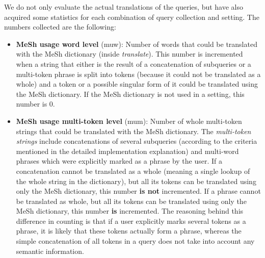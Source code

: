 \documentclass[a4paper,11pt]{article}
\begin{document}
	We do not only evaluate the actual translations of the queries, but have also acquired some statistics for each combination of query collection and setting. The numbers collected are the following:
	\begin{itemize}
		\item \textbf{MeSh usage word level} (muw): Number of words that could be translated with the MeSh dictionary (inside \textit{translate}). This number is incremented when a string that either is the result of a concatenation of subqueries or a multi-token phrase is split into tokens (because it could not be translated as a whole) and a token or a possible singular form of it could be translated using the MeSh dictionary. If the MeSh dictionary is not used in a setting, this number is 0. 
		\item \textbf{MeSh usage multi-token level} (mum): Number of whole multi-token strings that could be translated with the MeSh dictionary. The \textit{multi-token strings} include concatenations of several subqueries (according to the criteria mentioned in the detailed implementation explanation) and multi-word phrases which were explicitly marked as a phrase by the user. If a concatenation cannot be translated as a whole (meaning a single lookup of the whole string in the dictionary), but all its tokens can be translated using only the MeSh dictionary, this number \textbf{is not} incremented. If a phrase cannot be translated as whole, but all its tokens can be translated using only the MeSh dictionary, this number \textbf{is} incremented. The reasoning behind this difference in counting is that if a user explicitly marks several tokens as a phrase, it is likely that these tokens actually form a phrase, whereas the simple concatenation of all tokens in a query does not take into account any semantic information.
		

\end{itemize}
\end{document}

